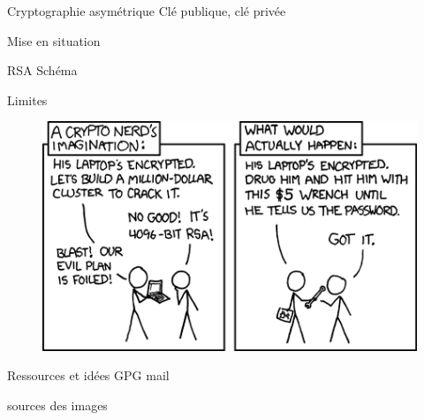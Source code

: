 \documentclass{beamer}
\begin{document}
\begin{frame}{Cryptographie asymétrique}
  Clé publique, clé privée

  Mise en situation
\end{frame}

\begin{frame}{RSA}
  Schéma
  \end{frame}

\begin{frame}{Limites}
  \begin{figure}
    \centering
    \includegraphics[scale = 0.5]{xkcdsecurity.png}
  \end{figure}
\end{frame}

\begin{frame}{Ressources et idées}
  GPG mail
  
  sources des images
  \end{frame}
\end{document}
